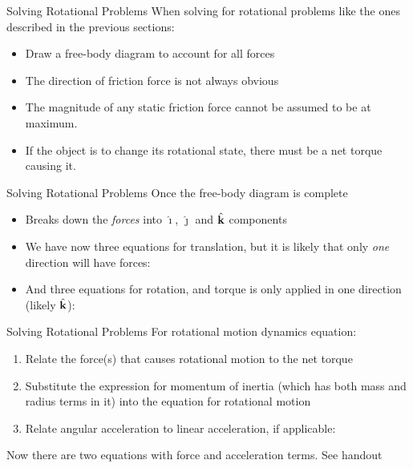 \documentclass[12pt,compress,aspectratio=169]{beamer}
\newcommand{\mb}[1]{\ensuremath\mathbf{#1}}
\newcommand{\iii}{\bm{\hat{\imath}}}
\newcommand{\jjj}{\bm{\hat{\jmath}}}
\newcommand{\kkk}{\hat{\mb{k}}}
\newcommand{\eq}[2]{\vspace{#1}{\Large\begin{displaymath}#2\end{displaymath}}}
\begin{document}
\begin{frame}{Solving Rotational Problems}
  When solving for rotational problems like the ones described in the previous
  sections:
  \begin{itemize}
  \item Draw a free-body diagram to account for all forces
  \item The direction of friction force is not always obvious
  \item The magnitude of any static friction force cannot be assumed to be at
    maximum.
  \item If the object is to change its rotational state, there must be a net
    torque causing it.
  \end{itemize}
\end{frame}



\begin{frame}{Solving Rotational Problems}
  Once the free-body diagram is complete
  \begin{itemize}
  \item Breaks down the \emph{forces} into $\iii$, $\jjj$ and $\kkk$ components
  \item We have now three equations for translation, but it is likely that only
    \emph{one} direction will have forces:

    \eq{-.3in}{
      \sum F_x=ma_x\quad\quad \sum F_y=ma_y\quad\quad \sum F_z=ma_z
    }
  \item And three equations for rotation, and torque is only applied in one
    direction (likely $\kkk$):
    
    \eq{-.3in}{
      \sum\tau_x=I_x\alpha_x\quad\quad \sum\tau_y=I_y\alpha_y\quad\quad 
      \sum\tau_z=I_z\alpha_z
    }
  \end{itemize}
\end{frame}



\begin{frame}{Solving Rotational Problems}
  For rotational motion dynamics equation:
  \begin{enumerate}
  \item Relate the force(s) that causes rotational motion to the net torque

    \eq{-.2in}{
      \tau=Fr
    }
  \item Substitute the expression for momentum of inertia (which has both mass
    and radius terms in it) into the equation for rotational motion
  \item Relate angular acceleration to linear acceleration, if applicable:

    \eq{-.25in}{
      \alpha=\frac{a}{R}
    }
  \end{enumerate}
  Now there are two equations with force and acceleration terms. See handout
\end{frame}
\end{document}
